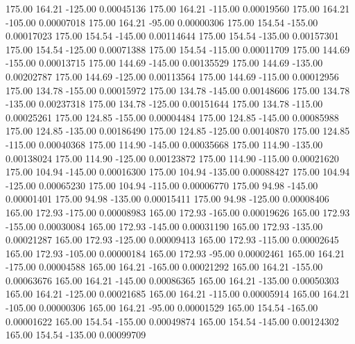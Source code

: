     175.00    164.21   -125.00     0.00045136
    175.00    164.21   -115.00     0.00019560
    175.00    164.21   -105.00     0.00007018
    175.00    164.21    -95.00     0.00000306
    175.00    154.54   -155.00     0.00017023
    175.00    154.54   -145.00     0.00114644
    175.00    154.54   -135.00     0.00157301
    175.00    154.54   -125.00     0.00071388
    175.00    154.54   -115.00     0.00011709
    175.00    144.69   -155.00     0.00013715
    175.00    144.69   -145.00     0.00135529
    175.00    144.69   -135.00     0.00202787
    175.00    144.69   -125.00     0.00113564
    175.00    144.69   -115.00     0.00012956
    175.00    134.78   -155.00     0.00015972
    175.00    134.78   -145.00     0.00148606
    175.00    134.78   -135.00     0.00237318
    175.00    134.78   -125.00     0.00151644
    175.00    134.78   -115.00     0.00025261
    175.00    124.85   -155.00     0.00004484
    175.00    124.85   -145.00     0.00085988
    175.00    124.85   -135.00     0.00186490
    175.00    124.85   -125.00     0.00140870
    175.00    124.85   -115.00     0.00040368
    175.00    114.90   -145.00     0.00035668
    175.00    114.90   -135.00     0.00138024
    175.00    114.90   -125.00     0.00123872
    175.00    114.90   -115.00     0.00021620
    175.00    104.94   -145.00     0.00016300
    175.00    104.94   -135.00     0.00088427
    175.00    104.94   -125.00     0.00065230
    175.00    104.94   -115.00     0.00006770
    175.00     94.98   -145.00     0.00001401
    175.00     94.98   -135.00     0.00015411
    175.00     94.98   -125.00     0.00008406
    165.00    172.93   -175.00     0.00008983
    165.00    172.93   -165.00     0.00019626
    165.00    172.93   -155.00     0.00030084
    165.00    172.93   -145.00     0.00031190
    165.00    172.93   -135.00     0.00021287
    165.00    172.93   -125.00     0.00009413
    165.00    172.93   -115.00     0.00002645
    165.00    172.93   -105.00     0.00000184
    165.00    172.93    -95.00     0.00002461
    165.00    164.21   -175.00     0.00004588
    165.00    164.21   -165.00     0.00021292
    165.00    164.21   -155.00     0.00063676
    165.00    164.21   -145.00     0.00086365
    165.00    164.21   -135.00     0.00050303
    165.00    164.21   -125.00     0.00021685
    165.00    164.21   -115.00     0.00005914
    165.00    164.21   -105.00     0.00000306
    165.00    164.21    -95.00     0.00001529
    165.00    154.54   -165.00     0.00001622
    165.00    154.54   -155.00     0.00049874
    165.00    154.54   -145.00     0.00124302
    165.00    154.54   -135.00     0.00099709
